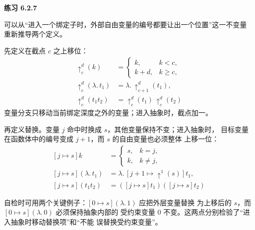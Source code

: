 \begin{taplsolutionentrybox}
\label{sol:translator:6.2.7}
\textbf{练习 6.2.7}

可以从“进入一个绑定子时，外部自由变量的编号都要让出一个位置”这一不变量
重新推导两个定义。

先定义在截点 \(c\) 之上移位：
\[
\begin{aligned}
\uparrow^d_c(k)
  &=
  \begin{cases}
    k,&k<c,\\
    k+d,&k\geq c,
  \end{cases}\\
\uparrow^d_c(\lambda.\,t_1)
  &=\lambda.\,\uparrow^d_{c+1}(t_1),\\
\uparrow^d_c(t_1t_2)
  &=\uparrow^d_c(t_1)\,\uparrow^d_c(t_2)
\end{aligned}
\]
变量分支只移动当前绑定深度之外的变量；进入抽象时，截点加一。

再定义替换。变量 \(j\) 命中时换成 \(s\)，其他变量保持不变；进入抽象时，
目标变量在函数体中的编号变成 \(j+1\)，而 \(s\) 的自由变量也必须整体
上移一位：
\[
\begin{aligned}
[j\mapsto s]k
  &=
  \begin{cases}
    s,&k=j,\\
    k,&k\neq j,
  \end{cases}\\
[j\mapsto s](\lambda.\,t_1)
  &=\lambda.\,[j+1\mapsto\uparrow^1(s)]t_1,\\
[j\mapsto s](t_1t_2)
  &=([j\mapsto s]t_1)([j\mapsto s]t_2)
\end{aligned}
\]

自检时可用两个关键例子：\([0\mapsto s](\lambda.\,1)\) 应把外层变量替换
为上移后的 \(s\)，而 \([0\mapsto s](\lambda.\,0)\) 必须保持抽象内部的
受约束变量 \(0\) 不变。这两点分别检验了“进入抽象时移动替换项”和“不能
误替换受约束变量”。

\end{taplsolutionentrybox}
